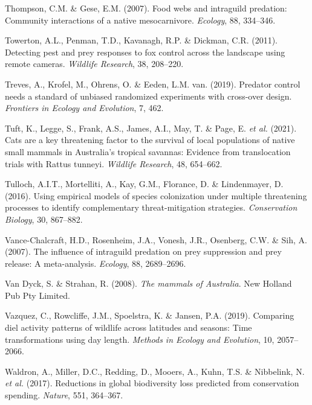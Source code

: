 \documentclass[11pt,a4paper,titlepage,twoside,openright]{style/unimelbthesis}
\begin{document}
\begin{mainmatter}
\leavevmode\hypertarget{ref-thompson2007food}{}%
Thompson, C.M. \& Gese, E.M. (2007). Food webs and intraguild predation: Community interactions of a native mesocarnivore. \emph{Ecology}, 88, 334--346.

\leavevmode\hypertarget{ref-towerton2011detecting}{}%
Towerton, A.L., Penman, T.D., Kavanagh, R.P. \& Dickman, C.R. (2011). Detecting pest and prey responses to fox control across the landscape using remote cameras. \emph{Wildlife Research}, 38, 208--220.

\leavevmode\hypertarget{ref-treves2019predator}{}%
Treves, A., Krofel, M., Ohrens, O. \& Eeden, L.M. van. (2019). Predator control needs a standard of unbiased randomized experiments with cross-over design. \emph{Frontiers in Ecology and Evolution}, 7, 462.

\leavevmode\hypertarget{ref-tuft2021cats}{}%
Tuft, K., Legge, S., Frank, A.S., James, A.I., May, T. \& Page, E. \emph{et al.} (2021). Cats are a key threatening factor to the survival of local populations of native small mammals in Australia's tropical savannas: Evidence from translocation trials with Rattus tunneyi. \emph{Wildlife Research}, 48, 654--662.

\leavevmode\hypertarget{ref-tulloch2016using}{}%
Tulloch, A.I.T., Mortelliti, A., Kay, G.M., Florance, D. \& Lindenmayer, D. (2016). Using empirical models of species colonization under multiple threatening processes to identify complementary threat-mitigation strategies. \emph{Conservation Biology}, 30, 867--882.

\leavevmode\hypertarget{ref-vance2007influence}{}%
Vance-Chalcraft, H.D., Rosenheim, J.A., Vonesh, J.R., Osenberg, C.W. \& Sih, A. (2007). The influence of intraguild predation on prey suppression and prey release: A meta-analysis. \emph{Ecology}, 88, 2689--2696.

\leavevmode\hypertarget{ref-van2008mammals}{}%
Van Dyck, S. \& Strahan, R. (2008). \emph{The mammals of Australia}. New Holland Pub Pty Limited.

\leavevmode\hypertarget{ref-vazquez2019comparing}{}%
Vazquez, C., Rowcliffe, J.M., Spoelstra, K. \& Jansen, P.A. (2019). Comparing diel activity patterns of wildlife across latitudes and seasons: Time transformations using day length. \emph{Methods in Ecology and Evolution}, 10, 2057--2066.

\leavevmode\hypertarget{ref-waldron2017reductions}{}%
Waldron, A., Miller, D.C., Redding, D., Mooers, A., Kuhn, T.S. \& Nibbelink, N. \emph{et al.} (2017). Reductions in global biodiversity loss predicted from conservation spending. \emph{Nature}, 551, 364--367.


\end{mainmatter}
\end{document}
